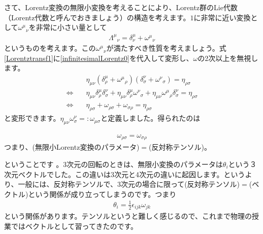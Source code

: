 \documentclass[report,paper=a4, fontsize=12pt, line_length=16cm, number_of_lines=33,dvipdfmx]{jlreq}
\newenvironment{important}{\begin{tcolorbox}[
  colback = white,
  colframe = red!35,
  boxrule = 2mm,
  fonttitle = \bfseries,
  after = \noindent] }{\end{tcolorbox}}
\numberwithin{equation}{chapter}
\begin{document}
さて、Lorentz変換の無限小変換を考えることにより、Lorentz群のLie代数（Lorentz代数と呼んでおきましょう）の構造を考えます。$1$に非常に近い変換として$\omega^{\mu}{}_{\nu}$を非常に小さい量として
\begin{align}
  \Lambda^{\mu}{}_{\nu}=\delta^{\mu}_{\nu}+\omega^{\mu}{}_{\nu}\label{infinitesimalLorentz0}
\end{align}
というものを考えます。この$\omega^{\mu}{}_{\nu}$が満たすべき性質を考えましょう。式\eqref{Lorentztransf1}に\eqref{infinitesimalLorentz0}を代入して変形し、$\omega$の2次以上を無視します。
\begin{align}
  &\eta_{\mu\nu}(\delta^{\mu}_{\rho}+\omega^{\mu}{}_{\rho})(\delta^{\nu}_{\sigma}+\omega^{\nu}{}_{\sigma})=\eta_{\rho\sigma}\\
  \Leftrightarrow\quad&\eta_{\mu\nu}\delta^{\mu}_{\rho}\delta^{\nu}_{\sigma}+\eta_{\mu\nu}\delta^{\mu}_{\rho}\omega^{\nu}{}_{\sigma}+\eta_{\mu\nu}\omega^{\mu}{}_{\rho}\delta^{\nu}_{\sigma}=\eta_{\rho\sigma}\\
  \Leftrightarrow\quad&\eta_{\rho\sigma}+\omega_{\rho\sigma}+\omega_{\sigma\rho}=\eta_{\rho\sigma}
\end{align}
と変形できます。$\eta_{\mu\nu}\omega^{\nu}_{\sigma}=:\omega_{\mu\sigma}$と定義しました。得られたのは
\begin{important}
  \begin{align}
    \omega_{\rho\sigma}=\omega_{\sigma\rho}\label{infinitesimalLorentz1}
  \end{align}
  つまり、(無限小Lorentz変換のパラメータ)$=$(反対称テンソル)。
\end{important}
ということです
。3次元の回転のときは、無限小変換のパラメータは$\theta_i$という３次元ベクトルでした。この違いは3次元と4次元の違いに起因します。というより、一般には、反対称テンソルで、3次元の場合に限って(反対称テンソル)$=$(ベクトル)という関係が成り立ってしまうのです。つまり
\begin{align}
  \theta_{i}=\frac12 \epsilon_{ijk}\omega_{jk}
\end{align}
という関係があります。テンソルというと難しく感じるので、これまで物理の授業ではベクトルとして習ってきたのです。
\end{document}
